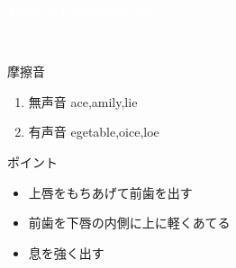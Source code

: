 \documentclass[aspectratio=169,xcolor={dvipsnames,table}]{beamer}
\begin{document}
\begin{frame}
\centering
  \textcolor{white}{\Huge\bfseries Today's Pronunciation}\pause

 \vspace{30pt}

  \textcolor{white}{\Huge\bfseries {}, }
\end{frame}
 \begin{frame}[plain]{摩擦音}

\large

\begin{enumerate}
 \item  無声音 \hspace{22pt}ace,\hspace{1\zw}amily,\hspace{1\zw}lie
 \item  有声音 \hspace{20pt}egetable,\hspace{1\zw}oice,\hspace{1\zw}loe
\end{enumerate}


\vspace*{20pt}

\normalsize
ポイント

\begin{itemize}
 \item 上唇をもちあげて前歯を出す
 \item 前歯を下唇の内側に上に軽くあてる
 \item 息を強く出す
\end{itemize}

\hfill{}
\end{frame}
\end{document}
